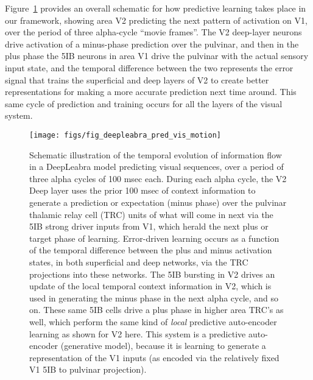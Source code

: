 \documentclass[11pt,twoside]{article}
\newif\myifpdf
\begin{document}
Figure~\ref{fig.pred_vis_motion} provides an overall schematic for how predictive learning takes place in our framework, showing area V2 predicting the next pattern of activation on V1, over the period of three alpha-cycle ``movie frames''.  The V2 deep-layer neurons drive activation of a minus-phase prediction over the pulvinar, and then in the plus phase the 5IB neurons in area V1 drive the pulvinar with the actual sensory input state, and the temporal difference between the two represents the error signal that trains the superficial and deep layers of V2 to create better representations for making a more accurate prediction next time around. This same cycle of prediction and training occurs for all the layers of the visual system. 

\begin{figure}
  \centering\texttt{[image: figs/fig\_deepleabra\_pred\_vis\_motion]}
  \caption{\footnotesize Schematic illustration of the temporal evolution of information flow in a DeepLeabra model predicting visual sequences, over a period of three alpha cycles of 100 msec each.  During each alpha cycle, the V2 Deep layer uses the prior 100 msec of context information to generate a prediction or expectation (minus phase) over the pulvinar thalamic relay cell (TRC) units of what will come in next via the 5IB strong driver inputs from V1, which herald the next plus or target phase of learning.  Error-driven learning occurs as a function of the temporal difference between the plus and minus activation states, in both superficial and deep networks, via the TRC projections into these networks.  The 5IB bursting in V2 drives an update of the local temporal context information in V2, which is used in generating the minus phase in the next alpha cycle, and so on.  These same 5IB cells drive a plus phase in higher area TRC's as well, which perform the same kind of {\em local} predictive auto-encoder learning as shown for V2 here.  This system is a predictive auto-encoder (generative model), because it is learning to generate a representation of the V1 inputs (as encoded via the relatively fixed V1 5IB to pulvinar projection).}
  \label{fig.pred_vis_motion}
\end{figure}
\end{document}
